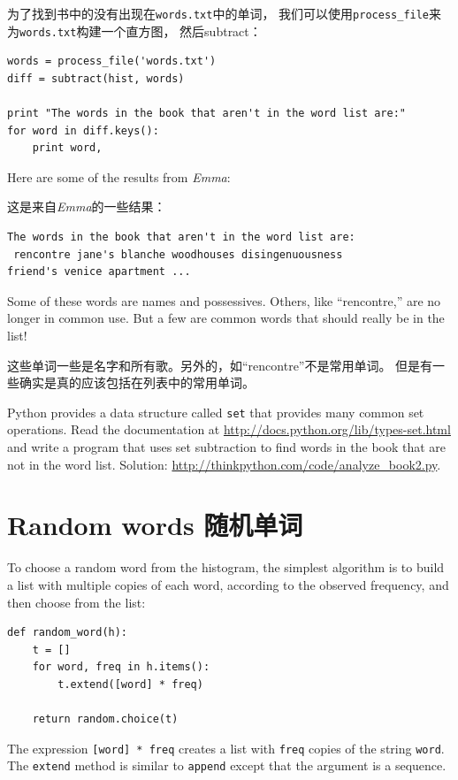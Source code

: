 \documentclass[10pt]{book}
\begin{document}
\begin{CJK}{UTF8}{gbsn}
为了找到书中的没有出现在{\tt words.txt}中的单词，
我们可以使用\verb"process_file"来为{\tt words.txt}构建一个直方图，
然后subtract：

\begin{verbatim}
words = process_file('words.txt')
diff = subtract(hist, words)

print "The words in the book that aren't in the word list are:"
for word in diff.keys():
    print word,
\end{verbatim}
%
Here are some of the results from {\em Emma}:

这是来自{\em Emma}的一些结果：

\begin{verbatim}
The words in the book that aren't in the word list are:
 rencontre jane's blanche woodhouses disingenuousness 
friend's venice apartment ...
\end{verbatim}
%
Some of these words are names and possessives.  Others, like
``rencontre,'' are no longer in common use.  But a few are common
words that should really be in the list!

这些单词一些是名字和所有歌。另外的，如``rencontre''不是常用单词。
但是有一些确实是真的应该包括在列表中的常用单词。

\begin{exercise}

Python provides a data structure called {\tt set} that provides many
common set operations.  Read the documentation at
\url{http://docs.python.org/lib/types-set.html} and write a program
that uses set subtraction to find words in the book that are not in
the word list.  Solution: \url{http://thinkpython.com/code/analyze_book2.py}.

\end{exercise}


\section{Random words 随机单词}
\label{randomwords}

To choose a random word from the histogram, the simplest algorithm
is to build a list with multiple copies of each word, according
to the observed frequency, and then choose from the list:

\begin{verbatim}
def random_word(h):
    t = []
    for word, freq in h.items():
        t.extend([word] * freq)

    return random.choice(t)
\end{verbatim}
%
The expression {\tt [word] * freq} creates a list with {\tt freq}
copies of the string {\tt word}.  The {\tt extend}
method is similar to {\tt append} except that the argument is
a sequence.


\end{CJK}
\end{document}
